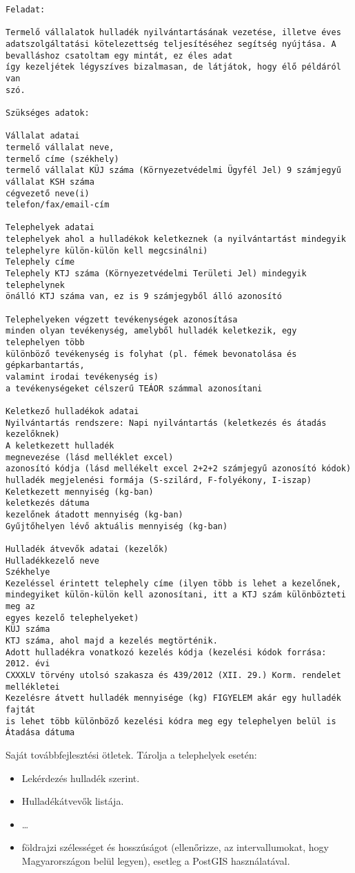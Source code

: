\documentclass[a4paper]{article}
\begin{document}
\begin{verbatim}
Feladat: 

Termelő vállalatok hulladék nyilvántartásának vezetése, illetve éves
adatszolgáltatási kötelezettség teljesítéséhez segítség nyújtása. A
bevalláshoz csatoltam egy mintát, ez éles adat
így kezeljétek légyszíves bizalmasan, de látjátok, hogy élő példáról van
szó.

Szükséges adatok:

Vállalat adatai
termelő vállalat neve,
termelő címe (székhely)
termelő vállalat KÜJ száma (Környezetvédelmi Ügyfél Jel) 9 számjegyű
vállalat KSH száma
cégvezető neve(i)
telefon/fax/email-cím

Telephelyek adatai
telephelyek ahol a hulladékok keletkeznek (a nyilvántartást mindegyik
telephelyre külön-külön kell megcsinálni)
Telephely címe
Telephely KTJ száma (Környezetvédelmi Területi Jel) mindegyik telephelynek
önálló KTJ száma van, ez is 9 számjegyből álló azonosító

Telephelyeken végzett tevékenységek azonosítása
minden olyan tevékenység, amelyből hulladék keletkezik, egy telephelyen több
különböző tevékenység is folyhat (pl. fémek bevonatolása és gépkarbantartás,
valamint irodai tevékenység is)
a tevékenységeket célszerű TEÁOR számmal azonosítani

Keletkező hulladékok adatai
Nyilvántartás rendszere: Napi nyilvántartás (keletkezés és átadás
kezelőknek)
A keletkezett hulladék
megnevezése (lásd melléklet excel)
azonosító kódja (lásd mellékelt excel 2+2+2 számjegyű azonosító kódok)
hulladék megjelenési formája (S-szilárd, F-folyékony, I-iszap)
Keletkezett mennyiség (kg-ban)
keletkezés dátuma
kezelőnek átadott mennyiség (kg-ban)
Gyűjtőhelyen lévő aktuális mennyiség (kg-ban)

Hulladék átvevők adatai (kezelők)
Hulladékkezelő neve
Székhelye
Kezeléssel érintett telephely címe (ilyen több is lehet a kezelőnek,
mindegyiket külön-külön kell azonosítani, itt a KTJ szám különbözteti meg az
egyes kezelő telephelyeket)
KÜJ száma
KTJ száma, ahol majd a kezelés megtörténik.
Adott hulladékra vonatkozó kezelés kódja (kezelési kódok forrása: 2012. évi
CXXXLV törvény utolsó szakasza és 439/2012 (XII. 29.) Korm. rendelet
mellékletei
Kezelésre átvett hulladék mennyisége (kg) FIGYELEM akár egy hulladék fajtát
is lehet több különböző kezelési kódra meg egy telephelyen belül is
Átadása dátuma
\end{verbatim}

Saját továbbfejlesztési ötletek. Tárolja a telephelyek esetén:
\begin{itemize}
    \item Lekérdezés hulladék szerint.
    \item Hulladékátvevők listája.
    \item \ldots
    \item földrajzi szélességet és hosszúságot (ellenőrizze, az intervallumokat,
	hogy Magyarországon belül legyen), esetleg a PostGIS
	használatával.
\end{itemize}
\end{document}
